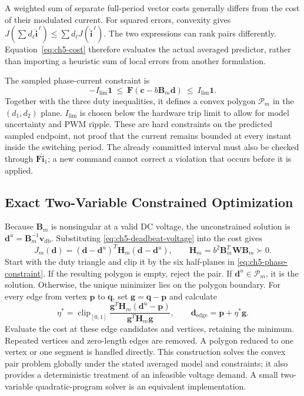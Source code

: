 A weighted sum of separate full-period vector costs generally differs from the cost of their modulated current. For squared errors, convexity gives $J(\sum d_\ell\widehat{\mathbf i}^{\,\ell})\le\sum d_\ell J(\widehat{\mathbf i}^{\,\ell})$. The two expressions can rank pairs differently. Equation~\eqref{eq:ch5-cost} therefore evaluates the actual averaged predictor, rather than importing a heuristic sum of local errors from another formulation.

The sampled phase-current constraint is
\begin{equation}
-I_{\mathrm{lim}}\mathbf1\ \le\ \mathbf F(\mathbf c-b\mathbf B_m\mathbf d)
\ \le\ I_{\mathrm{lim}}\mathbf1.
\label{eq:ch5-phase-constraint}
\end{equation}
Together with the three duty inequalities, it defines a convex polygon $\mathcal P_m$ in the $(d_1,d_2)$ plane. $I_{\mathrm{lim}}$ is chosen below the hardware trip limit to allow for model uncertainty and PWM ripple. These are hard constraints on the predicted sampled endpoint, not proof that the current remains bounded at every instant inside the switching period. The already committed interval must also be checked through $\mathbf F\widehat{\mathbf i}_1$; a new command cannot correct a violation that occurs before it is applied.

\subsection{Exact Two-Variable Constrained Optimization}
Because $\mathbf B_m$ is nonsingular at a valid DC voltage, the unconstrained solution is $\mathbf d^u=\mathbf B_m^{-1}\mathbf v_{\mathrm{db}}$. Substituting \eqref{eq:ch5-deadbeat-voltage} into the cost gives
\begin{equation}
J_m(\mathbf d)=(\mathbf d-\mathbf d^u)^T\mathbf H_m(\mathbf d-\mathbf d^u),\qquad
\mathbf H_m=b^2\mathbf B_m^T\mathbf W\mathbf B_m\succ0.
\label{eq:ch5-hessian}
\end{equation}
Start with the duty triangle and clip it by the six half-planes in \eqref{eq:ch5-phase-constraint}. If the resulting polygon is empty, reject the pair. If $\mathbf d^u\in\mathcal P_m$, it is the solution. Otherwise, the unique minimizer lies on the polygon boundary. For every edge from vertex $\mathbf p$ to $\mathbf q$, set $\mathbf g=\mathbf q-\mathbf p$ and calculate
\begin{equation}
\eta^\ast=\operatorname{clip}_{[0,1]}
\frac{\mathbf g^T\mathbf H_m(\mathbf d^u-\mathbf p)}{\mathbf g^T\mathbf H_m\mathbf g},\qquad
\mathbf d_{\mathrm{edge}}=\mathbf p+\eta^\ast\mathbf g.
\label{eq:ch5-edge-projection}
\end{equation}
Evaluate the cost at these edge candidates and vertices, retaining the minimum. Repeated vertices and zero-length edges are removed. A polygon reduced to one vertex or one segment is handled directly. This construction solves the convex pair problem globally under the stated averaged model and constraints; it also provides a deterministic treatment of an infeasible voltage demand. A small two-variable quadratic-program solver is an equivalent implementation.

